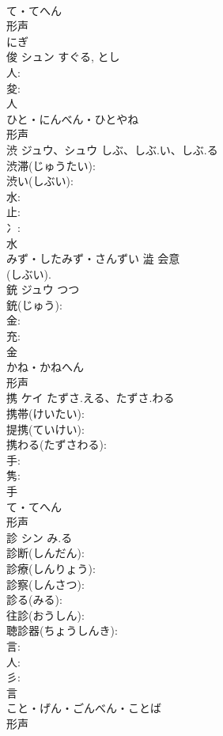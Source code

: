 \documentclass[8pt]{extreport}
\begin{document}
\begin{CJK}{UTF8}{min}
\\	て・てへん	
\\	形声 
\\	にぎ 
\\	俊	シュン		すぐる, とし	
\\	人: 
\\	夋: 
\\	人	
\\	ひと・にんべん・ひとやね	
\\	形声 
\\	渋	ジュウ、シュウ	しぶ、しぶ.い、しぶ.る		
\\	渋滞(じゅうたい): 
\\	渋い(しぶい): 
\\	水: 
\\	止: 
\\	冫: 
\\	水	
\\	みず・したみず・さんずい	澁	会意 
\\	(しぶい). 
\\	銃	ジュウ	つつ		
\\	銃(じゅう): 
\\	金: 
\\	充: 
\\	金	
\\	かね・かねへん	
\\	形声 
\\	携	ケイ	たずさ.える、たずさ.わる		
\\	携帯(けいたい): 
\\	提携(ていけい): 
\\	携わる(たずさわる): 
\\	手: 
\\	隽: 
\\	手	
\\	て・てへん	
\\	形声 
\\	診	シン	み.る		
\\	診断(しんだん): 
\\	診療(しんりょう): 
\\	診察(しんさつ): 
\\	診る(みる): 
\\	往診(おうしん): 
\\	聴診器(ちょうしんき): 
\\	言: 
\\	人: 
\\	彡: 
\\	言	
\\	こと・げん・ごんべん・ことば	
\\	形声 

\end{CJK}
\end{document}
